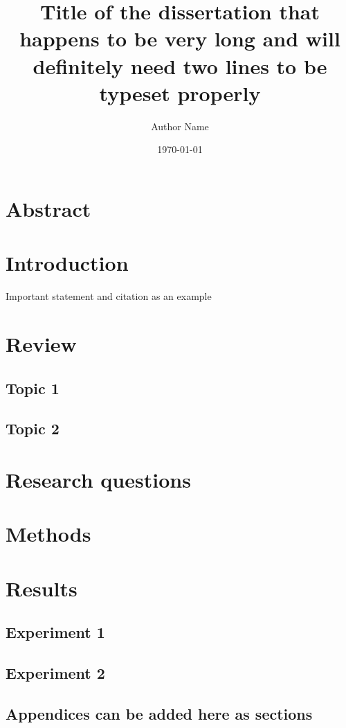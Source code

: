 \documentclass{uhthesis}
\title{Title of the dissertation that happens to be very long and will definitely need two lines to be typeset properly}
\author{Author Name}
\date{\today}
\begin{document}
\maketitle
\tableofcontents
\newpage

\section{Abstract}
\section{Introduction}
Important statement and citation as an example \cite{totesimportant}
\section{Review}
    \subsection{Topic 1}
    \subsection{Topic 2}
\section{Research questions}
\section{Methods}
\section{Results}
    \subsection{Experiment 1}
    \subsection{Experiment 2}

\begin{appendices}
    \section{Appendices can be added here as sections}
\end{appendices}

\printbibliography
\end{document}
